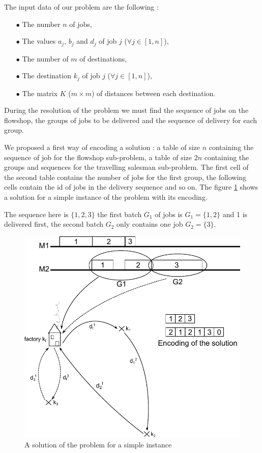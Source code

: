 \documentclass[UTF8, twoside]{EPURapport}
\begin{document}
	The input data of our problem are the following :
\begin{itemize}
\item[$\bullet$] The number $n$ of jobs,
\item[$\bullet$] The values $a_j$, $b_j$ and $d_j$ of job $j$ ($\forall j \in [1,n]$),
\item[$\bullet$] The number of $m$ of destinations,
\item[$\bullet$] The destination $k_j$ of job $j$ ($\forall j \in [1,n]$),
\item[$\bullet$] The matrix $K$ ($m \times m$) of distances between each destination.\\
\end{itemize}

	During the resolution of the problem we must find the sequence of jobs on the flowshop, the groups of jobs to be delivered and the sequence of delivery for each group.

	We proposed a first way of encoding a solution : a table of size $n$ containing the sequence of job for the flowshop sub-problem, a table of size $2n$ containing the groups and sequences for the travelling salesman sub-problem. The first cell of the second table contains the number of jobs for the first group, the following cells contain the id of jobs in the delivery sequence and so on. The figure \ref{problem} shows a solution for a simple instance of the problem with its encoding. 
	
	The sequence here is $\{1,2,3\}$ the first batch $G_1$ of jobs is $G_1 = \{1,2\}$ and 1 is delivered first, the second batch $G_2$ only contains one job $G_2 = \{3\}$.
	
	
\begin{figure}
	\centering \includegraphics{images/problem.pdf}
	\caption {A solution of the problem for a simple instance}	
	\label {problem}
\end{figure}
\end{document}
